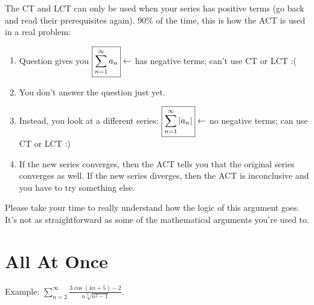 \documentclass[11pt]{article}
\begin{document}
The CT and LCT can only be used when your series has positive terms (go back and
read their prerequisites again). 90\% of the time, this is how the ACT is used
in a real problem:
\begin{enumerate}

  \item Question gives you $\fbox{$\displaystyle \sum_{n=1}^\infty a_n$} \gets$ has negative terms; can't
  use CT or LCT :(

  \item You don't answer the question just yet.

  \item Instead, you look at a different series:
  $\fbox{$\displaystyle \sum_{n=1}^\infty \left| a_n \right|$} \gets$ no
  negative terms; can use CT or LCT :)

  \item If the new series converges, then the ACT tells you that the original
  series converges as well. If the new series diverges, then the ACT is
  inconclusive and you have to try something else.

\end{enumerate}
Please take your time to really understand how the logic of this argument goes.
It's not as straightforward as some of the mathematical arguments you're used
to.

\newpage
\section{All At Once}

Example: $\displaystyle \sum_{n=2}^\infty
\frac{3\cos(4n+5)-2}{n\sqrt[3]{n^2-1}}$.
\end{document}
